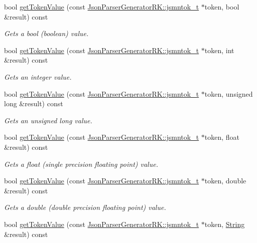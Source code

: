 \begin{DoxyCompactItemize}
bool \hyperlink{class_json_parser_a5f9e5c2453307a99a54fcf26fbd68dd4}{get\+Token\+Value} (const \hyperlink{struct_json_parser_generator_r_k_1_1jsmntok__t}{Json\+Parser\+Generator\+R\+K\+::jsmntok\+\_\+t} $\ast$token, bool \&result) const
\begin{DoxyCompactList}\small\item\em Gets a bool (boolean) value. \end{DoxyCompactList}\item 
bool \hyperlink{class_json_parser_a875e5b4b01c9cd597e09b13e59fe6252}{get\+Token\+Value} (const \hyperlink{struct_json_parser_generator_r_k_1_1jsmntok__t}{Json\+Parser\+Generator\+R\+K\+::jsmntok\+\_\+t} $\ast$token, int \&result) const
\begin{DoxyCompactList}\small\item\em Gets an integer value. \end{DoxyCompactList}\item 
bool \hyperlink{class_json_parser_ad6289b63a2281dc516e4a81aa3660ac7}{get\+Token\+Value} (const \hyperlink{struct_json_parser_generator_r_k_1_1jsmntok__t}{Json\+Parser\+Generator\+R\+K\+::jsmntok\+\_\+t} $\ast$token, unsigned long \&result) const
\begin{DoxyCompactList}\small\item\em Gets an unsigned long value. \end{DoxyCompactList}\item 
bool \hyperlink{class_json_parser_a37a6ad66b9697ceb6b789b4c9abaa3ab}{get\+Token\+Value} (const \hyperlink{struct_json_parser_generator_r_k_1_1jsmntok__t}{Json\+Parser\+Generator\+R\+K\+::jsmntok\+\_\+t} $\ast$token, float \&result) const
\begin{DoxyCompactList}\small\item\em Gets a float (single precision floating point) value. \end{DoxyCompactList}\item 
bool \hyperlink{class_json_parser_af378b1400c3f091ae6ba67dc588ca863}{get\+Token\+Value} (const \hyperlink{struct_json_parser_generator_r_k_1_1jsmntok__t}{Json\+Parser\+Generator\+R\+K\+::jsmntok\+\_\+t} $\ast$token, double \&result) const
\begin{DoxyCompactList}\small\item\em Gets a double (double precision floating point) value. \end{DoxyCompactList}\item 
bool \hyperlink{class_json_parser_a44cff567586e80ba63d39324e5929672}{get\+Token\+Value} (const \hyperlink{struct_json_parser_generator_r_k_1_1jsmntok__t}{Json\+Parser\+Generator\+R\+K\+::jsmntok\+\_\+t} $\ast$token, \hyperlink{class_string}{String} \&result) const

\end{DoxyCompactItemize}
